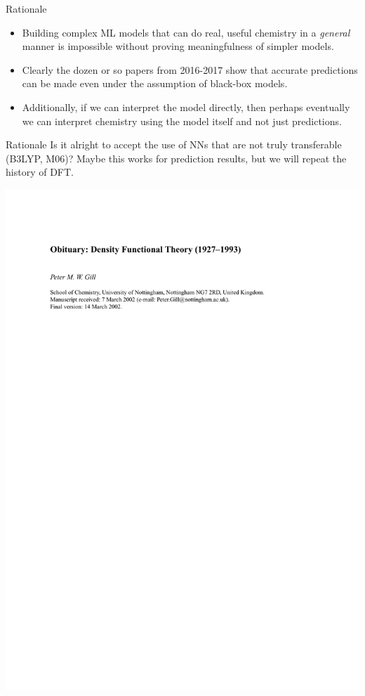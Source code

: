 \documentclass[compress]{beamer}
\begin{document}
\begin{frame}{Rationale}
  \begin{itemize}
  \item Building complex ML models that can do real, useful chemistry in a \emph{general} manner is impossible without proving meaningfulness of simpler models.
  \item Clearly the dozen or so papers from 2016-2017 show that accurate predictions can be made even under the assumption of black-box models.
  \item Additionally, if we can interpret the model directly, then perhaps eventually we can interpret chemistry using the model itself and not just predictions.
  \end{itemize}
\end{frame}

\begin{frame}{Rationale}
  Is it alright to accept the use of NNs that are not truly transferable (B3LYP, M06)? Maybe this works for prediction results, but we will repeat the history of DFT.
  \begin{center}
    \includegraphics[width=1.00\textwidth]{./figures/obit_gs.pdf}
  \end{center}
\end{frame}
\end{document}
